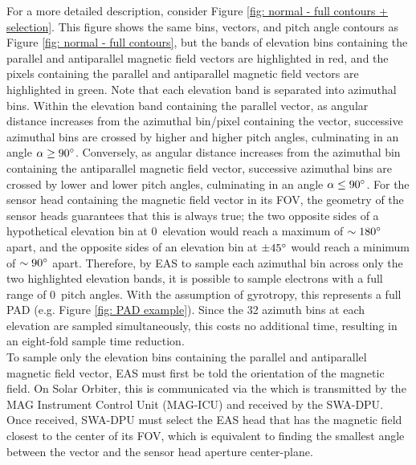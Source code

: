 For a more detailed description, consider Figure \ref{fig: normal - full contours + selection}. This figure shows the same bins, vectors, and pitch angle contours as Figure \ref{fig: normal - full contours}, but the bands of elevation bins containing the parallel and antiparallel magnetic field vectors are highlighted in red, and the pixels containing the parallel and antiparallel magnetic field vectors are highlighted in green. Note that each elevation band is separated into azimuthal bins. Within the elevation band containing the parallel vector, as angular distance increases from the azimuthal bin/pixel containing the vector, successive azimuthal bins are crossed by higher and higher pitch angles, culminating in an angle \(\alpha\geq90\degree\). Conversely, as angular distance increases from the azimuthal bin containing the antiparallel magnetic field vector, successive azimuthal bins are crossed by lower and lower pitch angles, culminating in an angle \(\alpha\leq90\degree\). For the sensor head containing the magnetic field vector in its FOV, the geometry of the sensor heads guarantees that this is always true\cite{owen2021}; the two opposite sides of a hypothetical elevation bin at 0\degree\ elevation would reach a maximum of \(\sim180\degree\) apart, and the opposite sides of an elevation bin at \(\pm45\degree\) would reach a minimum of \(\sim90\degree\) apart. Therefore, by  EAS to sample each azimuthal bin across only the two highlighted elevation bands, it is possible to sample electrons with a full range of 0\degree\ pitch angles. With the assumption of gyrotropy, this represents a full PAD (e.g. Figure \ref{fig: PAD example}). Since the 32 azimuth bins at each elevation are sampled simultaneously, this costs no additional time, resulting in an eight-fold sample time reduction.
\\

To sample only the elevation bins containing the parallel and antiparallel magnetic field vector, EAS must first be told the orientation of the magnetic field. On Solar Orbiter, this is communicated via the  which is transmitted by the MAG Instrument Control Unit (MAG-ICU) and received by the SWA-DPU\cite{owen2021}\cite{owen2020}\cite{horbury2020}. Once received, SWA-DPU must select the EAS head that has the magnetic field closest to the center of its FOV, which is equivalent to finding the smallest angle between the vector and the sensor head aperture center-plane\cite{owen2021}.
\\

